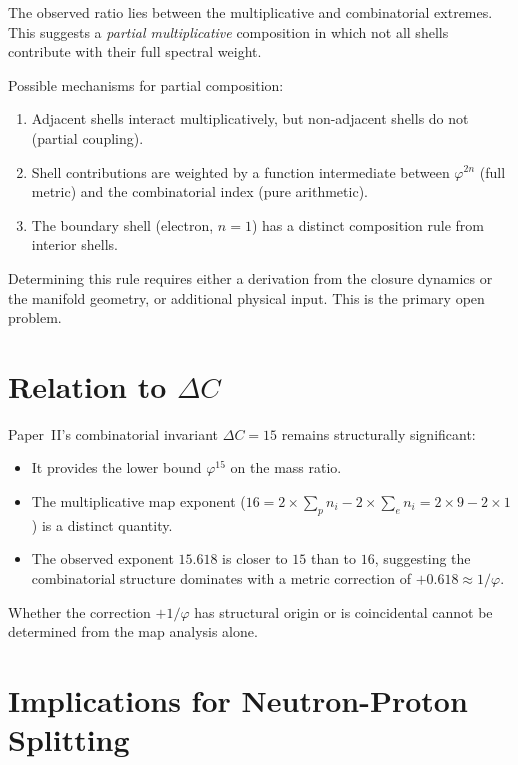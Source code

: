 \documentclass[12pt]{article}
\newcommand{\phig}{\varphi}
\begin{document}
The observed ratio lies between the multiplicative and combinatorial extremes. This suggests a \textit{partial multiplicative} composition in which not all shells contribute with their full spectral weight.

Possible mechanisms for partial composition:
\begin{enumerate}
    \item Adjacent shells interact multiplicatively, but non-adjacent shells do not (partial coupling).
    \item Shell contributions are weighted by a function intermediate between $\phig^{2n}$ (full metric) and the combinatorial index (pure arithmetic).
    \item The boundary shell (electron, $n=1$) has a distinct composition rule from interior shells.
\end{enumerate}

Determining this rule requires either a derivation from the closure dynamics or the manifold geometry, or additional physical input. This is the primary open problem.

\section{Relation to $\Delta C$}\label{sec:deltaC}

Paper~II's combinatorial invariant $\Delta C = 15$ remains structurally significant:
\begin{itemize}
    \item It provides the lower bound $\phig^{15}$ on the mass ratio.
    \item The multiplicative map exponent ($16 = 2 \times \sum_p n_i - 2 \times \sum_e n_i = 2 \times 9 - 2 \times 1$) is a distinct quantity.
    \item The observed exponent $15.618$ is closer to $15$ than to $16$, suggesting the combinatorial structure dominates with a metric correction of $+0.618 \approx 1/\phig$.
\end{itemize}

Whether the correction $+1/\phig$ has structural origin or is coincidental cannot be determined from the map analysis alone.

\section{Implications for Neutron-Proton Splitting}\label{sec:neutron}
\end{document}
